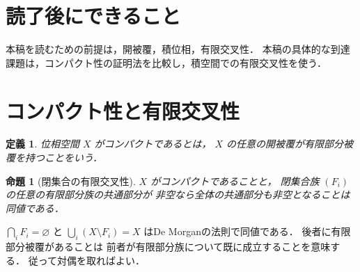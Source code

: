 \documentclass[a5paper,10pt,onecolumn]{jsarticle}
\makeatletter
\theoremstyle{mathnotetheorem}
\newtheorem{definition}[theorem]{定義}
\newtheorem{proposition}[theorem]{命題}
\renewcommand{\proofname}{証明}
\renewenvironment{proof}[1][\proofname]{%
  \par\pushQED{\qed}\normalfont\topsep4\p@\@plus2\p@\relax
  \trivlist\item[\hskip\labelsep\bfseries #1]\ignorespaces
}{\popQED\endtrivlist\@endpefalse}
\makeatother
\begin{document}
\section*{読了後にできること}
本稿を読むための前提は，開被覆，積位相，有限交叉性．
本稿の具体的な到達課題は，コンパクト性の証明法を比較し，積空間での有限交叉性を使う．


\section{コンパクト性と有限交叉性}
\begin{definition}
位相空間 $X$ がコンパクトであるとは，
$X$ の任意の開被覆が有限部分被覆を持つことをいう．
\end{definition}
\begin{proposition}[閉集合の有限交叉性]\label{prop:fip}
$X$ がコンパクトであることと，
閉集合族 $(F_i)$ の任意の有限部分族の共通部分が
非空なら全体の共通部分も非空となることは同値である．
\end{proposition}
\begin{proof}
$\bigcap_iF_i=\varnothing$ と
$\bigcup_i(X\setminus F_i)=X$ はDe Morganの法則で同値である．
後者に有限部分被覆があることは
前者が有限部分族について既に成立することを意味する．
従って対偶を取ればよい．
\end{proof}
\end{document}
